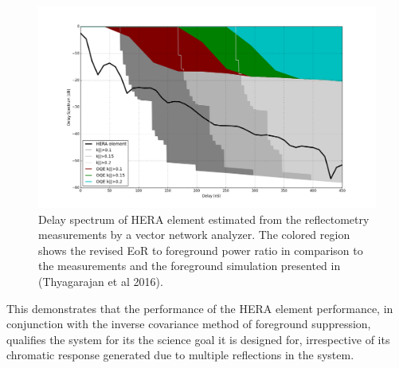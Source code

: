 \documentclass[twocolumn]{emulateapj}
\begin{document}
\begin{figure}[ht]
\centering
\includegraphics[width=\linewidth]{GB_reflectometry_part3/plot/HERA_ds_fg_sim_rev.png}
\caption{Delay spectrum of HERA element estimated from the reflectometry measurements by a vector network analyzer. The colored region shows the revised EoR to foreground power ratio in comparison to the measurements and the foreground simulation presented in (Thyagarajan et al 2016).}
\label{fig:sim_fg_revised}
\end{figure}
This demonstrates that the performance of the HERA element performance, in conjunction with the inverse covariance method of foreground suppression, qualifies the system for its the science goal it is designed for, irrespective of its chromatic response generated due to multiple reflections in the system.
\end{document}
